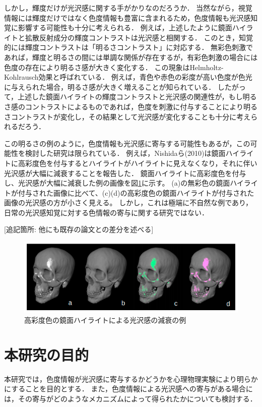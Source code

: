         しかし，輝度だけが光沢感に関する手がかりなのだろうか．
        当然ながら，視覚情報には輝度だけではなく色度情報も豊富に含まれるため，色度情報も光沢感知覚に影響する可能性も十分に考えられる．
        例えば，上述したように鏡面ハイライトと拡散反射成分の輝度コントラストは光沢感と相関する．
        このとき，知覚的には輝度コントラストは「明るさコントラスト」に対応する．
        無彩色刺激であれば，輝度と明るさの間には単調な関係が存在するが，有彩色刺激の場合には色度の存在により明るさ感が大きく変化する．
        この現象はHelmholtz-Kohlrausch効果と呼ばれている\cite{HKeffect}．
        例えば，青色や赤色の彩度が高い色度が色光に与えられた場合，明るさ感が大きく増えることが知られている．
        したがって，上述した鏡面ハイライトの輝度コントラストと光沢感の関連性が，もし明るさ感のコントラストによるものであれば，色度を刺激に付与することにより明るさコントラストが変化し，その結果として光沢感が変化することも十分に考えられるだろう．

        この明るさの例のように，色度情報も光沢感に寄与する可能性もあるが，この可能性を検討した研究は限られている．
        例えば，Nishidaら(2010)は鏡面ハイライトに高彩度色を付与するとハイライトがハイライトに見えなくなり，それに伴い光沢感が大幅に減衰することを報告した\cite{Nishida}．
        鏡面ハイライトに高彩度色を付与し、光沢感が大幅に減衰した例の画像を図\ref{SaturatedLowGloss}に示す。
        (a)の無彩色の鏡面ハイライトが付与された画像に比べて、(c)(d)の高彩度色の鏡面ハイライトが付与された画像の光沢感の方が小さく見える。
        しかし，これは極端に不自然な例であり，日常の光沢感知覚に対する色情報の寄与に関する研究ではない．

        [追記箇所: 他にも既存の論文との差分を述べる]

        \begin{figure}[h]
            \centering
            \includegraphics[width=15.0cm]{./img/SaturatedLowGloss.png}
            \caption{高彩度色の鏡面ハイライトによる光沢感の減衰の例}
            \label{SaturatedLowGloss}
        \end{figure}


    \section{本研究の目的}
        本研究では，色度情報が光沢感に寄与するかどうかを心理物理実験により明らかにすることを目的とする．
        また，色度情報による光沢感への寄与がある場合には，その寄与がどのようなメカニズムによって得られたかについても検討する．

